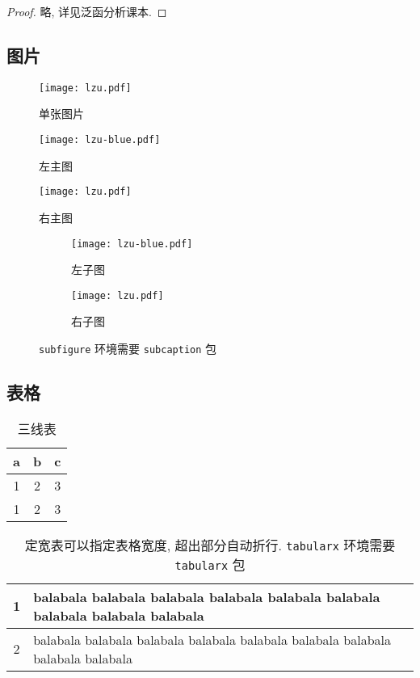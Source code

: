 \documentclass{lzuthesis}
\begin{document}
\begin{proof}
	略, 详见泛函分析课本. 
\end{proof}

\subsection{图片}

\begin{figure}[!h]
	\centering
	\texttt{[image: lzu.pdf]}
	\caption{单张图片}
	\label{zheng1}
\end{figure}

\begin{figure}[!h]
	\centering
	\begin{minipage}[t]{0.3\linewidth}
		\centering
		\texttt{[image: lzu-blue.pdf]}
		\caption{左主图}
	\end{minipage}
	\quad
	\begin{minipage}[t]{0.3\linewidth} 
		\centering 
		\texttt{[image: lzu.pdf]} 
		\caption{右主图} 
	\end{minipage}
\end{figure}

\begin{figure}[!h]
	\centering
	\begin{subfigure}[b]{0.25\linewidth}
		\texttt{[image: lzu-blue.pdf]}
		\caption{左子图}
	\end{subfigure}
	\quad
	\begin{subfigure}[b]{0.25\linewidth}
		\texttt{[image: lzu.pdf]}
		\caption{右子图}
	\end{subfigure}
	\caption{\texttt{subfigure} 环境需要 \texttt{subcaption} 包}
\end{figure}

\subsection{表格}

\begin{table}[!h]
	\centering
	\begin{tabular}{ccc}
		\hline
		a &b &c \\
		\hline
		1 &2 &3 \\
		1 &2 &3 \\
		\hline
	\end{tabular}
	\caption{三线表}
\end{table}

\begin{table}[!h]
	\centering
	\begin{tabularx}{0.6\linewidth}{c|X}
		\hline
		1 & balabala  balabala  balabala  balabala  balabala  balabala  balabala  balabala  balabala \\
		\hline
		2 & balabala  balabala  balabala  balabala  balabala  balabala  balabala  balabala  balabala \\
		\hline
	\end{tabularx}
	\caption{定宽表可以指定表格宽度, 超出部分自动折行. \texttt{tabularx} 环境需要 \texttt{tabularx} 包}
	\label{定宽表}
\end{table}
\end{document}
